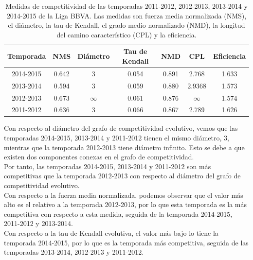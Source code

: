 \begin{table}[h]
\centering
\caption[Medidas de competitividad]{Medidas de competitividad de las temporadas 2011-2012, 2012-2013, 2013-2014 y 2014-2015 de la Liga BBVA. Las medidas son fuerza media normalizada (NMS), el diámetro, la tau de Kendall, el grado medio normalizado (NMD), la longitud del camino característico (CPL) y la eficiencia.}
\label{tbl:medidas}
\begin{tabular}{@{}ccccccc@{}}
\toprule
Temporada & NMS & Diámetro & Tau de Kendall & NMD & CPL & Eficiencia \\ \midrule
2014-2015 & 0.642                    & 3        & 0.054          & 0.891                   & 2.768                              & 1.633      \\
2013-2014 & 0.594                    & 3        & 0.059          & 0.880                   & 2.9368                             & 1.573      \\
2012-2013 & 0.673                    & $\infty$ & 0.061          & 0.876                   & $\infty$                           & 1.574      \\
2011-2012 & 0.636                    & 3        & 0.066          & 0.867                   & 2.789                              & 1.626      \\ \bottomrule
\end{tabular}
\end{table}

Con respecto al diámetro del grafo de competitividad evolutivo, vemos que las temporadas 2014-2015, 2013-2014 y 2011-2012 tienen el mismo diámetro, 3, mientras que la temporada 2012-2013 tiene diámetro infinito. Esto se debe a que existen dos componentes conexas en el grafo de competitividad.\\
Por tanto, las temporadas 2014-2015, 2013-2014 y 2011-2012 son más competitivas que la temporada 2012-2013 con respecto al diámetro del grafo de competitividad evolutivo.\\

Con respecto a la fuerza media normalizada, podemos observar que el valor más alto es el relativo a la temporada 2012-2013, por lo que esta temporada es la más competitiva con respecto a esta medida, seguida de la temporada 2014-2015, 2011-2012 y 2013-2014.\\

Con respecto a la tau de Kendall evolutiva, el valor más bajo lo tiene la temporada 2014-2015, por lo que es la temporada más competitiva, seguida de las temporadas 2013-2014, 2012-2013 y 2011-2012.\\

